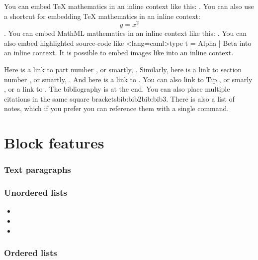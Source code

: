 You can embed TeX mathematics in an inline context like this: .
You can also use a shortcut for embedding TeX mathematics in an inline context: $$y=x^2$$.
You can embed MathML mathematics in an inline context like this: .
You can also embed highlighted source-code like \code<lang=caml>{type t = Alpha | Beta} into an inline context.
It is possible to embed images like  into an inline context.

Here is a link to part number , or smartly, .
Similarly, here is a link to section number , or smartly,
.  And here is a link to .  You can also link to Tip , or smarly ,
or a link to . The bibliography is at the
end\cite{bib:bib1}\cite{bib:bib2}\cite{bib:bib3}.  You can also place multiple
citations in the same square brackets\cite{bib:bib1}{bib:bib2}{bib:bib3}. There is
also a list of notes, which if you prefer
you can reference them with a single command.

\part{Block features}

\section[sec:foobar]{Text paragraphs}

\p{\lorem}
\p{\lorem}
\p{\lorem}
\p{\lorem}


\section{Unordered lists}

\p{\lorem}
\begin{itemize}
\item \lorem
\item \lorem
\item \lorem
\end{itemize}
\p{\lorem}

\section{Ordered lists}

